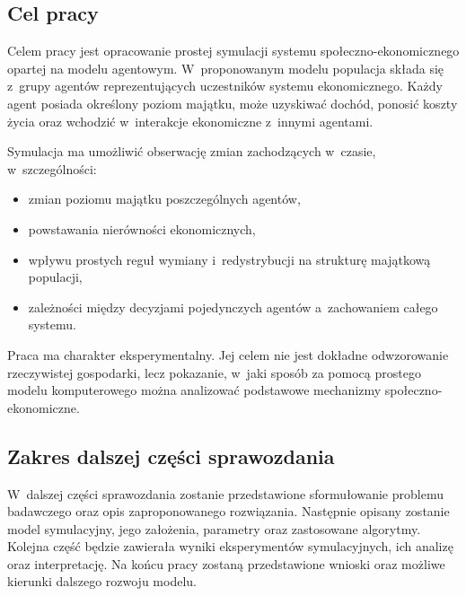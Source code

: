 \documentclass[polish]{projectreport}
\begin{document}
\subsection{Cel pracy}
\label{sec:goal}

Celem pracy jest opracowanie prostej symulacji systemu spo\l{}eczno-ekonomicznego opartej
na modelu agentowym. W~proponowanym modelu populacja sk\l{}ada si\k{e} z~grupy agent\'ow
reprezentuj\k{a}cych uczestnik\'ow systemu ekonomicznego. Ka\.{z}dy agent posiada okre\'slony
poziom maj\k{a}tku, mo\.{z}e uzyskiwa\'{c} doch\'od, ponosi\'{c} koszty \.{z}ycia oraz wchodzi\'{c}
w~interakcje ekonomiczne z~innymi agentami.

Symulacja ma umo\.{z}liwi\'{c} obserwacj\k{e} zmian zachodz\k{a}cych w~czasie, w~szczeg\'olno\'sci:
\begin{itemize}
  \item zmian poziomu maj\k{a}tku poszczeg\'olnych agent\'ow,
  \item powstawania nier\'owno\'sci ekonomicznych,
  \item wp\l{}ywu prostych regu\l{} wymiany i~redystrybucji na struktur\k{e} maj\k{a}tkow\k{a} populacji,
  \item zale\.{z}no\'sci mi\k{e}dzy decyzjami pojedynczych agent\'ow a~zachowaniem ca\l{}ego systemu.
\end{itemize}

Praca ma charakter eksperymentalny. Jej celem nie jest dok\l{}adne odwzorowanie
rzeczywistej gospodarki, lecz pokazanie, w~jaki spos\'ob za pomoc\k{a} prostego modelu
komputerowego mo\.{z}na analizowa\'{c} podstawowe mechanizmy spo\l{}eczno-ekonomiczne.

\subsection{Zakres dalszej cz\k{e}\'sci sprawozdania}
\label{sec:scope}

W~dalszej cz\k{e}\'sci sprawozdania zostanie przedstawione sformu\l{}owanie problemu badawczego
oraz opis zaproponowanego rozwi\k{a}zania. Nast\k{e}pnie opisany zostanie model symulacyjny,
jego za\l{}o\.{z}enia, parametry oraz zastosowane algorytmy. Kolejna cz\k{e}\'s\'{c} b\k{e}dzie zawiera\l{}a
wyniki eksperyment\'ow symulacyjnych, ich analiz\k{e} oraz interpretacj\k{e}. Na ko\'ncu pracy
zostan\k{a} przedstawione wnioski oraz mo\.{z}liwe kierunki dalszego rozwoju modelu.
\end{document}
